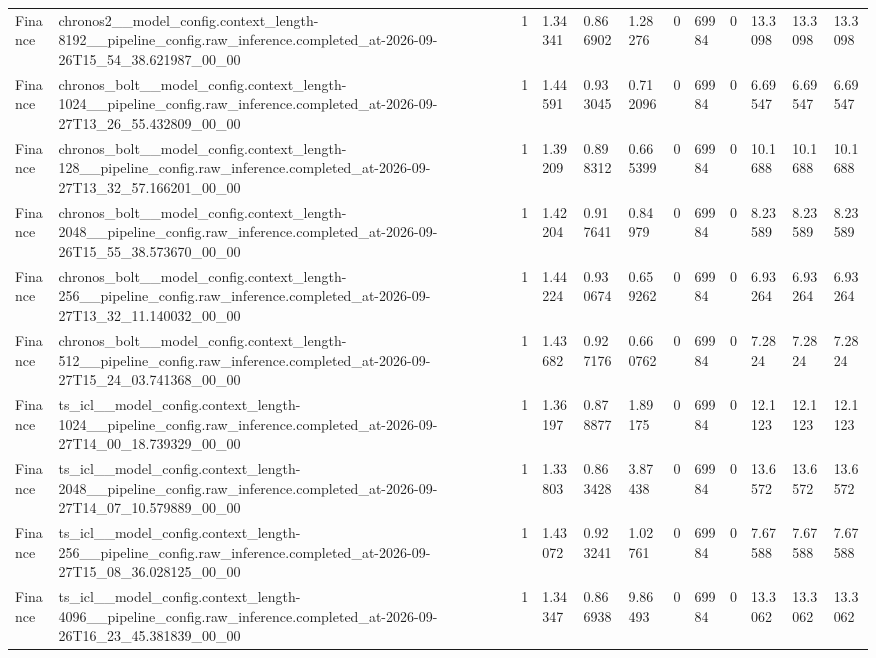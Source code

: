 \begin{tabular}{llllllllllll}
Finance & chronos2\_\_model\_config.context\_length-8192\_\_pipeline\_config.raw\_inference.completed\_at-2026-09-26T15\_54\_38.621987\_00\_00 & 1 & 1.34341 & 0.866902 & 1.28276 & 0 & 69984 & 0 & 13.3098 & 13.3098 & 13.3098 \\
Finance & chronos\_bolt\_\_model\_config.context\_length-1024\_\_pipeline\_config.raw\_inference.completed\_at-2026-09-27T13\_26\_55.432809\_00\_00 & 1 & 1.44591 & 0.933045 & 0.712096 & 0 & 69984 & 0 & 6.69547 & 6.69547 & 6.69547 \\
Finance & chronos\_bolt\_\_model\_config.context\_length-128\_\_pipeline\_config.raw\_inference.completed\_at-2026-09-27T13\_32\_57.166201\_00\_00 & 1 & 1.39209 & 0.898312 & 0.665399 & 0 & 69984 & 0 & 10.1688 & 10.1688 & 10.1688 \\
Finance & chronos\_bolt\_\_model\_config.context\_length-2048\_\_pipeline\_config.raw\_inference.completed\_at-2026-09-26T15\_55\_38.573670\_00\_00 & 1 & 1.42204 & 0.917641 & 0.84979 & 0 & 69984 & 0 & 8.23589 & 8.23589 & 8.23589 \\
Finance & chronos\_bolt\_\_model\_config.context\_length-256\_\_pipeline\_config.raw\_inference.completed\_at-2026-09-27T13\_32\_11.140032\_00\_00 & 1 & 1.44224 & 0.930674 & 0.659262 & 0 & 69984 & 0 & 6.93264 & 6.93264 & 6.93264 \\
Finance & chronos\_bolt\_\_model\_config.context\_length-512\_\_pipeline\_config.raw\_inference.completed\_at-2026-09-27T15\_24\_03.741368\_00\_00 & 1 & 1.43682 & 0.927176 & 0.660762 & 0 & 69984 & 0 & 7.2824 & 7.2824 & 7.2824 \\
Finance & ts\_icl\_\_model\_config.context\_length-1024\_\_pipeline\_config.raw\_inference.completed\_at-2026-09-27T14\_00\_18.739329\_00\_00 & 1 & 1.36197 & 0.878877 & 1.89175 & 0 & 69984 & 0 & 12.1123 & 12.1123 & 12.1123 \\
Finance & ts\_icl\_\_model\_config.context\_length-2048\_\_pipeline\_config.raw\_inference.completed\_at-2026-09-27T14\_07\_10.579889\_00\_00 & 1 & 1.33803 & 0.863428 & 3.87438 & 0 & 69984 & 0 & 13.6572 & 13.6572 & 13.6572 \\
Finance & ts\_icl\_\_model\_config.context\_length-256\_\_pipeline\_config.raw\_inference.completed\_at-2026-09-27T15\_08\_36.028125\_00\_00 & 1 & 1.43072 & 0.923241 & 1.02761 & 0 & 69984 & 0 & 7.67588 & 7.67588 & 7.67588 \\
Finance & ts\_icl\_\_model\_config.context\_length-4096\_\_pipeline\_config.raw\_inference.completed\_at-2026-09-26T16\_23\_45.381839\_00\_00 & 1 & 1.34347 & 0.866938 & 9.86493 & 0 & 69984 & 0 & 13.3062 & 13.3062 & 13.3062 \\

\end{tabular}
